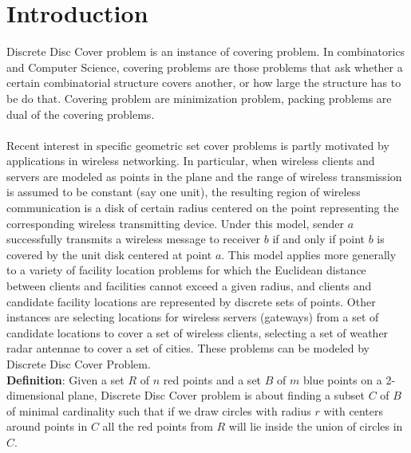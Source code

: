 \documentclass[12pt,a4wide]{report}
\theoremstyle{plain}
\theoremstyle{definition}
\theoremstyle{remark}
\begin{document}
\section{Introduction}
 Discrete Disc Cover problem is an instance of covering problem. In combinatorics and Computer Science, covering problems 
 are those problems that ask whether a certain combinatorial structure covers another, or how large the structure 
 has to be do that. Covering problem are 
 minimization problem, packing problems are dual of the covering problems. \\ \\
 Recent interest in specific geometric set cover problems is partly motivated by
 applications in wireless networking. In particular, when wireless clients and servers
 are modeled as points in the plane and the range of wireless transmission is assumed
 to be constant (say one unit), the resulting region of wireless communication is a
 disk of certain radius centered on the point representing the corresponding wireless
 transmitting device. Under this model, sender $a$ successfully transmits a wireless
 message to receiver $b$ if and only if point $b$ is covered by the unit disk centered at
 point $a$. This model applies more generally to a variety of facility location problems
 for which the Euclidean distance between clients and facilities cannot exceed a given
 radius, and clients and candidate facility locations are represented by discrete sets
 of points. Other instances are selecting locations for wireless servers (gateways) from a set of candidate
 locations to cover a set of wireless clients, selecting a set of weather radar antennae to cover a set of cities.
 These problems can be modeled by Discrete Disc Cover Problem. \\ 

 \textbf{Definition}: Given a set $R$ of $n$ red points and a set $B$ of $m$ blue points on a 2-dimensional plane, Discrete Disc Cover problem is 
 about finding a subset $C$ of $B$ of minimal cardinality such that if we draw  circles with radius $r$ with centers around points in $C$ all the red points from $R$ will lie
  inside the union of circles in $C$. 
\end{document}
